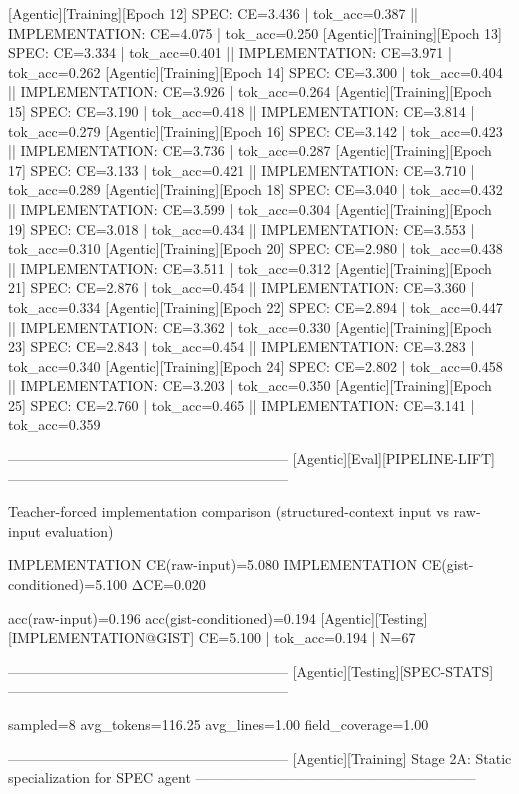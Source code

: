 [Agentic][Training][Epoch 12] SPEC: CE=3.436 | tok_acc=0.387  ||  IMPLEMENTATION: CE=4.075 | tok_acc=0.250
[Agentic][Training][Epoch 13] SPEC: CE=3.334 | tok_acc=0.401  ||  IMPLEMENTATION: CE=3.971 | tok_acc=0.262
[Agentic][Training][Epoch 14] SPEC: CE=3.300 | tok_acc=0.404  ||  IMPLEMENTATION: CE=3.926 | tok_acc=0.264
[Agentic][Training][Epoch 15] SPEC: CE=3.190 | tok_acc=0.418  ||  IMPLEMENTATION: CE=3.814 | tok_acc=0.279
[Agentic][Training][Epoch 16] SPEC: CE=3.142 | tok_acc=0.423  ||  IMPLEMENTATION: CE=3.736 | tok_acc=0.287
[Agentic][Training][Epoch 17] SPEC: CE=3.133 | tok_acc=0.421  ||  IMPLEMENTATION: CE=3.710 | tok_acc=0.289
[Agentic][Training][Epoch 18] SPEC: CE=3.040 | tok_acc=0.432  ||  IMPLEMENTATION: CE=3.599 | tok_acc=0.304
[Agentic][Training][Epoch 19] SPEC: CE=3.018 | tok_acc=0.434  ||  IMPLEMENTATION: CE=3.553 | tok_acc=0.310
[Agentic][Training][Epoch 20] SPEC: CE=2.980 | tok_acc=0.438  ||  IMPLEMENTATION: CE=3.511 | tok_acc=0.312
[Agentic][Training][Epoch 21] SPEC: CE=2.876 | tok_acc=0.454  ||  IMPLEMENTATION: CE=3.360 | tok_acc=0.334
[Agentic][Training][Epoch 22] SPEC: CE=2.894 | tok_acc=0.447  ||  IMPLEMENTATION: CE=3.362 | tok_acc=0.330
[Agentic][Training][Epoch 23] SPEC: CE=2.843 | tok_acc=0.454  ||  IMPLEMENTATION: CE=3.283 | tok_acc=0.340
[Agentic][Training][Epoch 24] SPEC: CE=2.802 | tok_acc=0.458  ||  IMPLEMENTATION: CE=3.203 | tok_acc=0.350
[Agentic][Training][Epoch 25] SPEC: CE=2.760 | tok_acc=0.465  ||  IMPLEMENTATION: CE=3.141 | tok_acc=0.359

------------------------------------------------------------
[Agentic][Eval][PIPELINE-LIFT]
------------------------------------------------------------

Teacher-forced implementation comparison (structured-context input vs raw-input evaluation)

IMPLEMENTATION CE(raw-input)=5.080
IMPLEMENTATION CE(gist-conditioned)=5.100
ΔCE=0.020

acc(raw-input)=0.196
acc(gist-conditioned)=0.194
[Agentic][Testing][IMPLEMENTATION@GIST] CE=5.100 | tok_acc=0.194 | N=67

------------------------------------------------------------
[Agentic][Testing][SPEC-STATS]
------------------------------------------------------------

sampled=8
avg_tokens=116.25
avg_lines=1.00
field_coverage=1.00

------------------------------------------------------------
[Agentic][Training] Stage 2A: Static specialization for SPEC agent
------------------------------------------------------------

